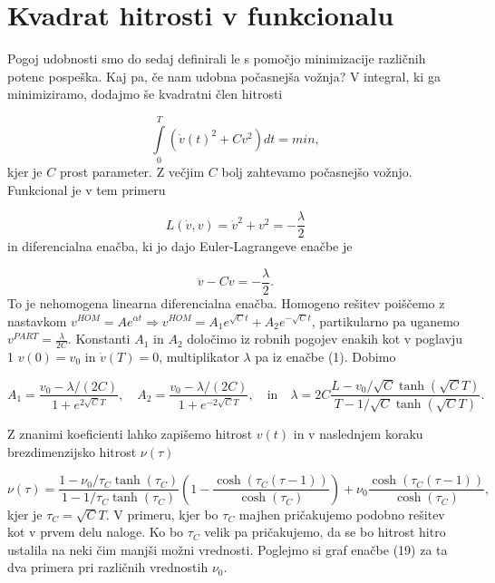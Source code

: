 \documentclass[slovene,11pt,a4paper]{article}
\begin{document}
\section{Kvadrat hitrosti v funkcionalu}

Pogoj udobnosti smo do sedaj definirali le s pomočjo minimizacije različnih potenc pospeška. Kaj pa, če nam udobna počasnejša vožnja? V integral, ki ga minimiziramo, dodajmo še kvadratni člen hitrosti

\begin{equation}
\int\limits_{0}^{T} \left( \dot{v}(t)^2 + C v^2 \right) dt = min,
\end{equation}
kjer je $C$ prost parameter. Z večjim $C$ bolj zahtevamo počasnejšo vožnjo. Funkcional je v tem primeru

\begin{equation}
L(\dot{v}, v) = \dot{v}^2 + v^2 = -\frac{\lambda}{2}
\end{equation}
in diferencialna enačba, ki jo dajo Euler-Lagrangeve enačbe je 

\begin{equation}
\ddot{v} - Cv = - \frac{\lambda}{2}.
\end{equation}
To je nehomogena linearna diferencialna enačba. Homogeno rešitev poiščemo z nastavkom $v^{HOM} = Ae^{\alpha t} \Rightarrow v^{HOM} = A_1 e^{\sqrt{C}t} + A_2 e^{-\sqrt{C}t}$, partikularno pa uganemo $v^{PART} = \frac{\lambda}{2C}$. Konstanti $A_1$ in $A_2$ določimo iz robnih pogojev enakih kot v poglavju 1 $v(0) = v_0$ in $\dot{v}(T) = 0$, multiplikator $\lambda$ pa iz enačbe (1). Dobimo

\[
A_1 = \frac{v_0 - \lambda/(2C)}{1+e^{2\sqrt{C}T}}, \quad
A_2 = \frac{v_0 - \lambda/(2C)}{1+e^{-2\sqrt{C}T}}, \quad \text{in} \quad
\lambda = 2C \frac{L-v_0/\sqrt{C}\tanh(\sqrt{C}T)}{T-1/\sqrt{C}\tanh(\sqrt{C}T)}.
\]

Z znanimi koeficienti lahko zapišemo hitrost $v(t)$ in v naslednjem koraku brezdimenzijsko hitrost $\nu(\tau)$

\begin{equation}
\nu(\tau) = \frac{1-\nu_0/\tau_C \tanh(\tau_C)}{1-1/\tau_C \tanh(\tau_C)} \left(
1-\frac{\cosh(\tau_C(\tau-1))}{\cosh(\tau_C)} \right) + 
\nu_0 \frac{\cosh(\tau_C(\tau-1))}{\cosh(\tau_C)},
\end{equation}
kjer je $\tau_C = \sqrt{C}T$. V primeru, kjer bo $\tau_C$ majhen pričakujemo podobno rešitev kot v prvem delu naloge. Ko bo $\tau_C$ velik pa pričakujemo, da se bo hitrost hitro ustalila na neki čim manjši možni vrednosti. Poglejmo si graf enačbe (19) za ta dva primera pri različnih vrednostih $\nu_0$.
\end{document}
